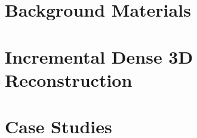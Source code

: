 \documentclass[ 9pt,
                twoside,
                openright,
                titlepage,
                dottedtoc,
                a5paper,
                fleqn,%
                headinclude,footinclude=true
                BCOR5mm,%
                numbers=noenddot,
                cleardoublepage=empty,%
                tablecaptionabove
                ]{scrbook}
\begin{document}

\maketitle

\pagestyle{empty}

\cleardoublepage
\newpage

%

\cleardoublepage
\newpage

\setcounter{page}{1}





\dominitoc%
\tableofcontents
\cleardoublepage
\newpage

\setcounter{page}{1}

\cleardoublepage

\part{Background Materials}



\part{Incremental Dense 3D Reconstruction}



\part{Case Studies}




\cleardoublepage

\appendix
{}





\cleardoublepage
{}
{}
\small


\end{document}
